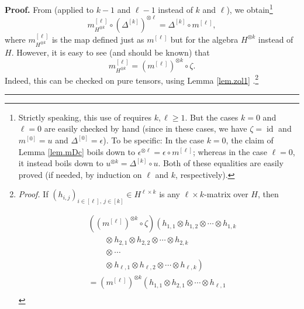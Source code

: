 \documentclass[numbers=enddot,12pt,final,onecolumn,notitlepage]{scrartcl}%
\theoremstyle{definition}
\newenvironment{proof}[1][Proof]{\noindent\textbf{#1.} }{\ \rule{0.5em}{0.5em}}
\begin{document}
\begin{proof}
From \cite[Exercise 1.4.22(c)]{GriRei} (applied to $k-1$ and $\ell-1$ instead
of $k$ and $\ell$), we obtain\footnote{Strictly speaking, this use of
\cite[Exercise 1.4.22(c)]{GriRei} requires $k,\ell\geq1$. But the cases $k=0$
and $\ell=0$ are easily checked by hand (since in these cases, we have
$\zeta=\operatorname*{id}$ and $m^{\left[  0\right]  }=u$ and $\Delta^{\left[
0\right]  }=\epsilon$). To be specific: In the case $k=0$, the claim of Lemma
\ref{lem.mDc} boils down to $\epsilon^{\otimes\ell}=\epsilon\circ m^{\left[
\ell\right]  }$; whereas in the case $\ell=0$, it instead boils down to
$u^{\otimes k}=\Delta^{\left[  k\right]  }\circ u$. Both of these equalities
are easily proved (if needed, by induction on $\ell$ and $k$, respectively).}%
\begin{equation}
m_{H^{\otimes k}}^{\left[  \ell\right]  }\circ\left(  \Delta^{\left[
k\right]  }\right)  ^{\otimes\ell}=\Delta^{\left[  k\right]  }\circ m^{\left[
\ell\right]  }, \label{pf.thm.sol-mac-1.mD1}%
\end{equation}
where $m_{H^{\otimes k}}^{\left[  \ell\right]  }$ is the map defined just as
$m^{\left[  \ell\right]  }$ but for the algebra $H^{\otimes k}$ instead of
$H$. However, it is easy to see (and should be known) that
\begin{equation}
m_{H^{\otimes k}}^{\left[  \ell\right]  }=\left(  m^{\left[  \ell\right]
}\right)  ^{\otimes k}\circ\zeta. \label{pf.thm.sol-mac-1.mz}%
\end{equation}
Indeed, this can be checked on pure tensors, using Lemma \ref{lem.zol1}%
.\footnote{\textit{Proof.} If $\left(  h_{i,j}\right)  _{i\in\left[
\ell\right]  ,\ j\in\left[  k\right]  }\in H^{\ell\times k}$ is any
$\ell\times k$-matrix over $H$, then
\par%
\begin{align*}
&  \left(  \left(  m^{\left[  \ell\right]  }\right)  ^{\otimes k}\circ
\zeta\right)  \left(  h_{1,1}\otimes h_{1,2}\otimes\cdots\otimes
h_{1,k}\right. \\
&  \ \ \ \ \ \ \ \ \ \ \left.  \otimes\ h_{2,1}\otimes h_{2,2}\otimes
\cdots\otimes h_{2,k}\right. \\
&  \ \ \ \ \ \ \ \ \ \ \left.  \otimes\ \cdots\right. \\
&  \ \ \ \ \ \ \ \ \ \ \left.  \otimes\ h_{\ell,1}\otimes h_{\ell,2}%
\otimes\cdots\otimes h_{\ell,k}\right) \\
&  =\left(  m^{\left[  \ell\right]  }\right)  ^{\otimes k}\left(
h_{1,1}\otimes h_{2,1}\otimes\cdots\otimes h_{\ell,1}\right. \\

\end{align*}}
\end{proof}
\end{document}
